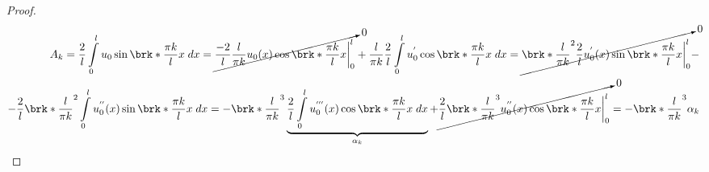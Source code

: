 \documentclass[../main.tex]{subfiles}
\begin{document}
\begin{proof}
\begin{align*}
	A_k = \dfrac{2}{l}\int\limits_{0}^{l}u_0\sin \brk*{\dfrac{\pi k}{l}x}\;dx = \cancelto{0}{\dfrac{-2}{l}\dfrac{l}{\pi k}u_0(x)\cos \brk*{\dfrac{\pi k}{l}x}\biggr|_0^l} + \dfrac{l}{\pi k}\dfrac{2}{l}\int\limits_0^l u_0^{'}\cos \brk*{\dfrac{\pi k}{l}x}\;dx = \cancelto{0}{\brk*{\dfrac{l}{\pi k}}^2 \dfrac{2}{l}u_0^{'}(x)\sin \brk*{\dfrac{\pi k}{l}x}\biggr|_0^l} - \\ - \dfrac{2}{l}\brk*{\dfrac{l}{\pi k}}^2 \int\limits_0^l u_0^{''}(x)\sin \brk*{\dfrac{\pi k}{l} x}\;dx = - \brk*{\dfrac{l}{\pi k}}^3 \underbrace{\dfrac{2}{l} \int\limits_0^l u_0^{'''}(x)\cos \brk*{\dfrac{\pi k}{l}x}\;dx}_{\alpha_k} + \cancelto{0}{\dfrac{2}{l}\brk*{\dfrac{l}{\pi k}}^3u_0^{''}(x)\cos \brk*{\dfrac{\pi k}{l}x}\biggr|_0^l} = - \brk*{\dfrac{l}{\pi k}}^3 \alpha_k
\end{align*}


\end{proof}
\end{document}
